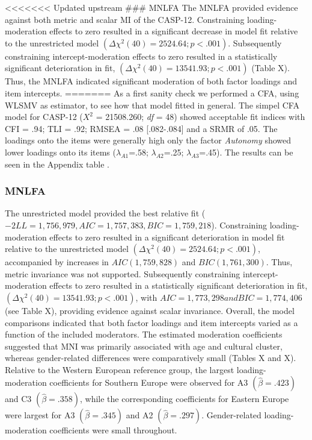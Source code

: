 \documentclass[
  man,
  floatsintext]{apa7}
\begin{document}
\textless\textless\textless\textless\textless\textless\textless{}
Updated upstream \#\#\# MNLFA The MNLFA provided evidence against both
metric and scalar MI of the CASP-12. Constraining loading-moderation
effects to zero resulted in a significant decrease in model fit relative
to the unrestricted model \((\Delta\chi^2(40)=2524.64; p<.001)\).
Subsequently constraining intercept-moderation effects to zero resulted
in a statistically significant deterioration in fit,
\((\Delta\chi^2(40)=13541.93; p<.001)\) (Table X). Thus, the MNLFA
indicated significant moderation of both factor loadings and item
intercepts. ======= As a first sanity check we performed a CFA, using
WLSMV as estimator, to see how that model fitted in general. The simpel
CFA model for CASP-12 (\(X^2\) = 21508.260; \emph{df} = 48) showed
acceptable fit indices with CFI = .94; TLI = .92; RMSEA = .08
{[}.082-.084{]} and a SRMR of .05. The loadings onto the items were
generally high only the factor \emph{Autonomy} showed lower loadings
onto its items (\(\lambda_{A1}\)=.58; \(\lambda_{A2}\)=.25;
\(\lambda_{A3}\)=.45). The results can be seen in the Appendix table .

\subsubsection{MNLFA}\label{mnlfa-1}

The unrestricted model provided the best relative fit
(\(-2LL = 1,756,979, AIC = 1,757,383, BIC = 1,759,218\)). Constraining
loading-moderation effects to zero resulted in a significant
deterioration in model fit relative to the unrestricted model
\((\Delta\chi^2(40)=2524.64; p<.001)\), accompanied by increases in
\(AIC (1,759,828)\) and \(BIC (1,761,300)\). Thus, metric invariance was
not supported. Subsequently constraining intercept-moderation effects to
zero resulted in a statistically significant deterioration in fit,
\((\Delta\chi^2(40)=13541.93; p<.001)\), with
\(AIC = 1,773,298 and BIC = 1,774,406\) (see Table X), providing
evidence against scalar invariance. Overall, the model comparisons
indicated that both factor loadings and item intercepts varied as a
function of the included moderators. The estimated moderation
coefficients suggested that MNI was primarily associated with age and
cultural cluster, whereas gender-related differences were comparatively
small (Tables X and X). Relative to the Western European reference
group, the largest loading-moderation coefficients for Southern Europe
were observed for A3 \((\hat\beta=.423)\) and C3 \((\hat\beta=.358)\),
while the corresponding coefficients for Eastern Europe were largest for
A3 \((\hat\beta=.345)\) and A2 \((\hat\beta=.297)\). Gender-related
loading-moderation coefficients were small throughout.
\end{document}
